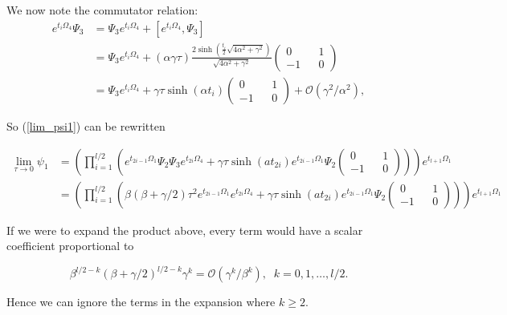 \documentclass{article}
\begin{document}
We now note the commutator relation:
\begin{align}
  e^{t_i\Omega_4}\Psi_3 &= \Psi_3e^{t_i\Omega_4} + [e^{t_i\Omega_4},\Psi_3] \nonumber \\
  &= \Psi_3e^{t_i\Omega_4} + (\alpha\gamma\tau)\frac{2\sinh\left(\frac{t_i}{2}\sqrt{4\alpha^2+\gamma^2}\right)}{\sqrt{4\alpha^2+\gamma^2}} \begin{pmatrix} 0 && 1 \\ -1 && 0 \end{pmatrix} \nonumber \\
  &= \Psi_3e^{t_i\Omega_4} + \gamma\tau\sinh(\alpha t_i)  \begin{pmatrix} 0 && 1 \\ -1 && 0 \end{pmatrix} + \mathcal{O}(\gamma^2/\alpha^2),
\end{align} 

So (\ref{lim_psi1}) can be rewritten

\begin{align}
  \lim_{\tau \rightarrow 0} \psi_1 &= \left(\prod_{i=1}^{l/2}\left(e^{t_{2i-1}\Omega_1}\Psi_2\Psi_3
    e^{t_{2i}\Omega_4} + \gamma\tau \sinh(at_{2i}) e^{t_{2i-1}\Omega_1}\Psi_2\begin{pmatrix} 0 && 1 \\ -1 && 0 \end{pmatrix} \right)\right)e^{t_{l+1}\Omega_1} \nonumber\\
    &=  \left(\prod_{i=1}^{l/2}\left(\beta(\beta+\gamma/2)\tau^2e^{t_{2i-1}\Omega_1}e^{t_{2i}\Omega_4} + \gamma\tau \sinh(at_{2i})e^{t_{2i-1}\Omega_1}\Psi_2 \begin{pmatrix} 0 && 1 \\ -1 && 0 \end{pmatrix} \right)\right)e^{t_{l+1}\Omega_1}
\end{align}

If we were to expand the product above, every term would have a scalar coefficient proportional to

\begin{equation}
  \beta^{l/2 - k}(\beta+\gamma/2)^{l/2-k}\gamma^k = \mathcal{O}(\gamma^k/\beta^k),  \; \; k = 0,1,\ldots,l/2.
\end{equation}

Hence we can ignore the terms in the expansion where $k \geq 2$.
\end{document}
